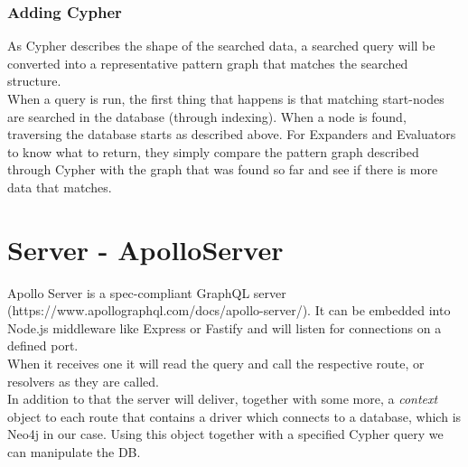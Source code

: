 \subsubsection{Adding Cypher}
As Cypher describes the shape of the searched data, a searched query will be converted into a representative pattern graph that matches the searched structure. \\
When a query is run, the first thing that happens is that matching start-nodes are searched in the database (through indexing). When a node is found, traversing the database starts as described above. For Expanders and Evaluators to know what to return, they simply compare the pattern graph described through Cypher with the graph that was found so far and see if there is more data that matches. 

\section{Server - ApolloServer}
Apollo Server is a spec-compliant GraphQL server (https://www.apollographql.com/docs/apollo-server/). It can be embedded into Node.js middleware like Express or Fastify and will listen for connections on a defined port. \\
When it receives one it will read the query and call the respective route, or resolvers as they are called. \\
In addition to that the server will deliver, together with some more, a \emph{context} object to each route that contains a driver which connects to a database, which is Neo4j in our case. Using this object together with a specified Cypher query we can manipulate the DB. 

